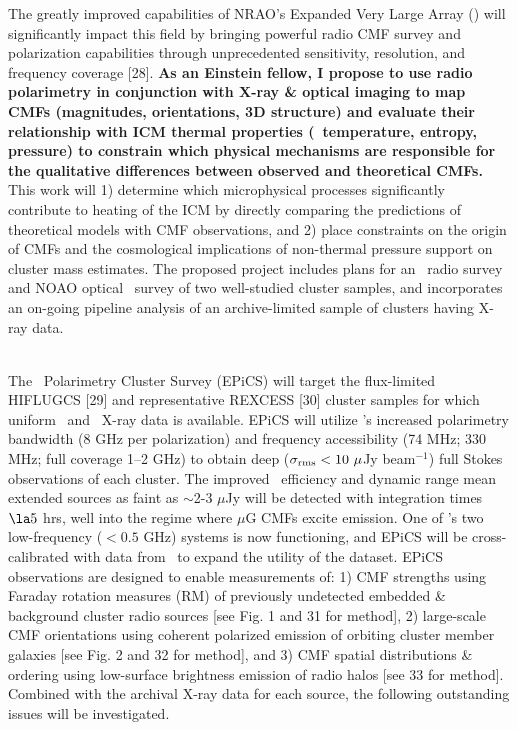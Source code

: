\documentclass[letterpaper,12pt]{article}
\newcommand{\myhead}{Cavagnolo, Einstein Proposal}
\begin{document}
The greatly improved capabilities of NRAO's Expanded Very Large Array
(\evla) will significantly impact this field by bringing powerful
radio CMF survey and polarization capabilities through unprecedented
sensitivity, resolution, and frequency coverage [28]. {\bf{As an
    Einstein fellow, I propose to use radio polarimetry in conjunction
    with X-ray \& optical imaging to map CMFs (magnitudes,
    orientations, 3D structure) and evaluate their relationship with
    ICM thermal properties (\eg\ temperature, entropy, pressure) to
    constrain which physical mechanisms are responsible for the
    qualitative differences between observed and theoretical CMFs.}}
This work will 1) determine which microphysical processes
significantly contribute to heating of the ICM by directly comparing
the predictions of theoretical models with CMF observations, and 2)
place constraints on the origin of CMFs and the cosmological
implications of non-thermal pressure support on cluster mass
estimates. The proposed project includes plans for an \evla\ radio
survey and NOAO optical \halpha\ survey of two well-studied cluster
samples, and incorporates an on-going pipeline analysis of an
archive-limited sample of clusters having X-ray data.\\

\markright{\myhead}\\
\indent The \evla\ Polarimetry Cluster Survey (EPiCS) will target the
flux-limited HIFLUGCS [29] and representative REXCESS [30] cluster
samples for which uniform \chandra\ and \xmm\ X-ray data is
available. EPiCS will utilize \evla's increased polarimetry bandwidth
(8 GHz per polarization) and frequency accessibility (74 MHz; 330 MHz;
full coverage 1--2 GHz) to obtain deep ($\sigma_{\rm{rms}} < 10
~\mu$Jy beam$^{-1}$) full Stokes observations of each cluster. The
improved \evla\ efficiency and dynamic range mean extended sources as
faint as $\sim$2-3 $\mu$Jy will be detected with integration times
$\la 5$ hrs, well into the regime where $\mu$G CMFs excite
emission. One of \evla's two low-frequency ($< 0.5$ GHz) systems is
now functioning, and EPiCS will be cross-calibrated with data from
\lofar\ to expand the utility of the dataset. EPiCS observations are
designed to enable measurements of: 1) CMF strengths using Faraday
rotation measures (RM) of previously undetected embedded \& background
cluster radio sources [see Fig. 1 and 31 for method], 2) large-scale
CMF orientations using coherent polarized emission of orbiting cluster
member galaxies [see Fig. 2 and 32 for method], and 3) CMF spatial
distributions \& ordering using low-surface brightness emission of
radio halos [see 33 for method]. Combined with the archival X-ray data
for each source, the following outstanding issues will be
investigated.
\end{document}
